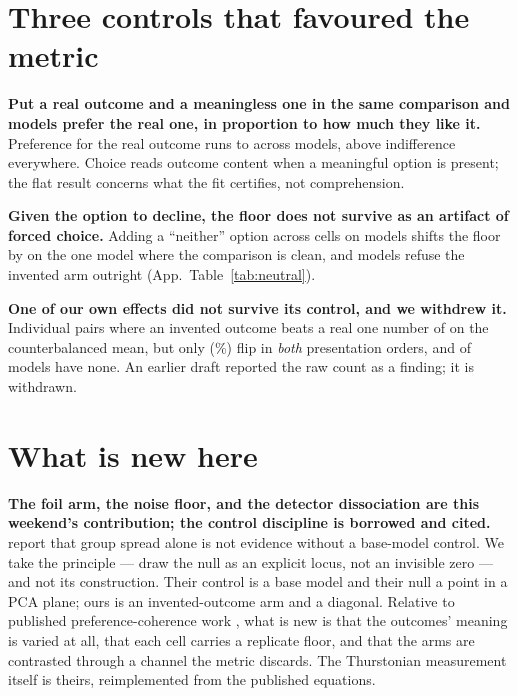 \documentclass[11pt,a4paper]{article}
\begin{document}
\section{Three controls that favoured the metric}\label{sec:favour}

\textbf{Put a real outcome and a meaningless one in the same comparison and
models prefer the real one, in proportion to how much they like it.}
Preference for the real outcome runs \MixPreferRealLo{} to \MixPreferRealHi{}
across \MixNModels{} models, above indifference everywhere. Choice reads outcome
content when a meaningful option is present; the flat result concerns what the
fit certifies, not comprehension.

\textbf{Given the option to decline, the floor does not survive as an
artifact of forced choice.} Adding a ``neither'' option across \NeutNCells{}
cells on \NeutNModels{} models shifts the floor by \NeutFloorShift{} on the one
model where the comparison is clean, and \NeutNRefuse{} models refuse the
invented arm outright (App.~Table~\ref{tab:neutral}).

\textbf{One of our own effects did not survive its control, and we withdrew
it.} Individual pairs where an invented outcome beats a real one number
\AvoidFlipsRaw{} of \AvoidNPairsTotal{} on the counterbalanced mean, but only
\AvoidFlipsRobust{} (\AvoidFlipsPct\%) flip in \emph{both} presentation orders,
and \AvoidNoFlipModels{} of \AvoidNModels{} models have none. An earlier draft
reported the raw count as a finding; it is withdrawn.

\section{What is new here}\label{sec:new}

\textbf{The foil arm, the noise floor, and the detector dissociation are this
weekend's contribution; the control discipline is borrowed and cited.}
\citet{riossialer2026loyalties} report that group spread alone is not evidence
without a base-model control. We take the principle --- draw the null as an
explicit locus, not an invisible zero --- and not its construction. Their
control is a base model and their null a point in a PCA plane; ours is an
invented-outcome arm and a diagonal.
Relative to published preference-coherence work \citep{mazeika2025utility}, what
is new is that the outcomes' meaning is varied at all, that each cell carries a
replicate floor, and that the arms are contrasted through a channel the metric
discards. The Thurstonian measurement itself is theirs, reimplemented from the
published equations.
\end{document}
